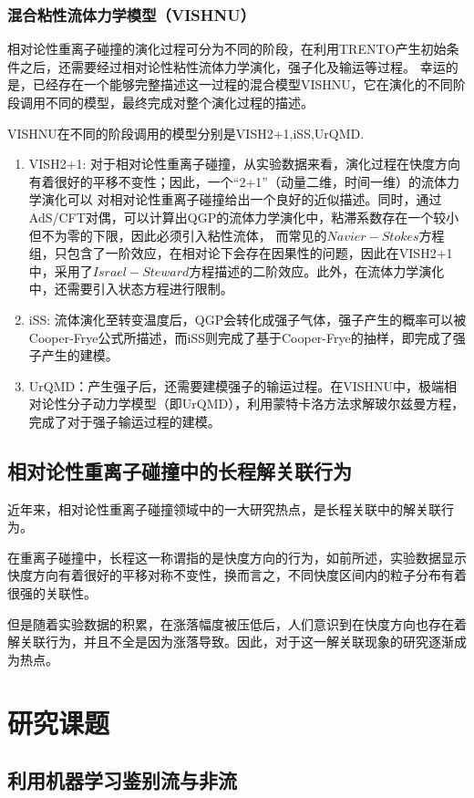 \documentclass[aps,pre,12pt,preprint,onecolumn,showpacs,showkeys]{revtex4-1}
\begin{document}
\subsubsection{混合粘性流体力学模型（VISHNU）}
相对论性重离子碰撞的演化过程可分为不同的阶段，在利用TRENTO产生初始条件之后，还需要经过相对论性粘性流体力学演化，强子化及输运等过程。
幸运的是，已经存在一个能够完整描述这一过程的混合模型VISHNU，它在演化的不同阶段调用不同的模型，最终完成对整个演化过程的描述。\par
VISHNU在不同的阶段调用的模型分别是VISH2+1,iSS,UrQMD.
\begin{enumerate}
    \item VISH2+1: 对于相对论性重离子碰撞，从实验数据来看，演化过程在快度方向有着很好的平移不变性；因此，一个“2+1”（动量二维，时间一维）的流体力学演化可以
    对相对论性重离子碰撞给出一个良好的近似描述。同时，通过AdS/CFT对偶，可以计算出QGP的流体力学演化中，粘滞系数存在一个较小但不为零的下限，因此必须引入粘性流体，
    而常见的$Navier-Stokes$方程组，只包含了一阶效应，在相对论下会存在因果性的问题，因此在VISH2+1中，采用了$Israel-Steward$方程描述的二阶效应。此外，在流体力学演化
    中，还需要引入状态方程进行限制。
    \item iSS: 流体演化至转变温度后，QGP会转化成强子气体，强子产生的概率可以被Cooper-Frye公式所描述，而iSS则完成了基于Cooper-Frye的抽样，即完成了强子产生的建模。
    \item UrQMD：产生强子后，还需要建模强子的输运过程。在VISHNU中，极端相对论性分子动力学模型（即UrQMD），利用蒙特卡洛方法求解玻尔兹曼方程，完成了对于强子输运过程的建模。
\end{enumerate}
\subsection{相对论性重离子碰撞中的长程解关联行为}
近年来，相对论性重离子碰撞领域中的一大研究热点，是长程关联中的解关联行为。\par
在重离子碰撞中，长程这一称谓指的是快度方向的行为，如前所述，实验数据显示快度方向有着很好的平移对称不变性，换而言之，不同快度区间内的粒子分布有着很强的关联性。\par
但是随着实验数据的积累，在涨落幅度被压低后，人们意识到在快度方向也存在着解关联行为，并且不全是因为涨落导致。因此，对于这一解关联现象的研究逐渐成为热点。
\section{研究课题}
\subsection{利用机器学习鉴别流与非流}
\end{document}
